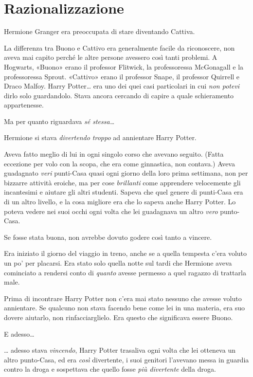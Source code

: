 
\chapter{Razionalizzazione}
\label{capitolo:21}

Hermione Granger era preoccupata di stare diventando Cattiva.

La differenza tra Buono e Cattivo era generalmente facile da riconoscere, non aveva mai capito perché le altre persone avessero così tanti problemi. A Hogwarts, «Buono» erano il professor Flitwick, la professoressa McGonagall e la professoressa Sprout. «Cattivo» erano il professor Snape, il professor Quirrell e Draco Malfoy. Harry Potter… era uno dei quei casi particolari in cui \textit{non potevi} dirlo solo guardandolo. Stava ancora cercando di capire a quale schieramento appartenesse.

Ma per quanto riguardava \textit{sé stessa…}

Hermione si stava \textit{divertendo troppo} ad annientare Harry Potter.

Aveva fatto meglio di lui in ogni singolo corso che avevano seguito. (Fatta eccezione per volo con la scopa, che era come ginnastica, non contava.) Aveva guadagnato \textit{veri} punti-Casa quasi ogni giorno della loro prima settimana, non per bizzarre attività eroiche, ma per cose \textit{brillanti} come apprendere velocemente gli incantesimi e aiutare gli altri studenti. Sapeva che quel genere di punti-Casa era di un altro livello, e la cosa migliore era che lo sapeva anche Harry Potter. Lo poteva vedere nei suoi occhi ogni volta che lei guadagnava un altro \textit{vero} punto-Casa.

Se fosse stata buona, non avrebbe dovuto godere così tanto a vincere.

Era iniziato il giorno del viaggio in treno, anche se a quella tempesta c’era voluto un po’ per placarsi. Era stato solo quella notte sul tardi che Hermione aveva cominciato a rendersi conto di \textit{quanto} avesse permesso a quel ragazzo di trattarla male.

Prima di incontrare Harry Potter non c’era mai stato nessuno che avesse voluto annientare. Se qualcuno non stava facendo bene come lei in una materia, era suo dovere aiutarlo, non rinfacciarglielo. Era questo che significava essere Buono.

E adesso…

… adesso stava \textit{vincendo}, Harry Potter trasaliva ogni volta che lei otteneva un altro punto-Casa, ed era \textit{così} divertente, i suoi genitori l’avevano messa in guardia contro la droga e sospettava che quello fosse \textit{più divertente} della droga.

